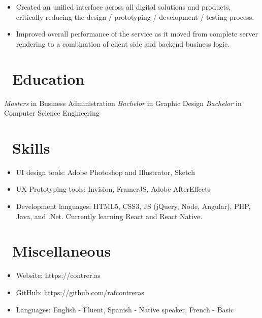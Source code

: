 \documentclass{resume}
\begin{document}
\begin{itemize}
  \item Created an unified interface across all digital solutions and products, critically reducing the design / prototyping / development / testing process.
  \item Improved overall performance of the service as it moved from complete server rendering to a combination of client side and backend business logic.
\end{itemize}

\section{\faGraduationCap\ Education}
\textit{Masters} in Business Administration
\textit{Bachelor} in Graphic Design
\textit{Bachelor} in Computer Science Engineering

\section{\faCogs\ Skills}
\begin{itemize}[parsep=0.5ex]
  \item UI design tools: Adobe Photoshop and Illustrator, Sketch
  \item UX Prototyping tools: Invision, FramerJS, Adobe AfterEffects
  \item Development languages: HTML5, CSS3, JS (jQuery, Node, Angular), PHP, Java, and .Net. Currently learning React and React Native.
\end{itemize}

\section{\faInfo\ Miscellaneous}
\begin{itemize}[parsep=0.5ex]
  \item Website: https://contrer.as
  \item GitHub: https://github.com/rafcontreras
  \item Languages: English - Fluent, Spanish - Native speaker, French - Basic
\end{itemize}

%
%
\end{document}
